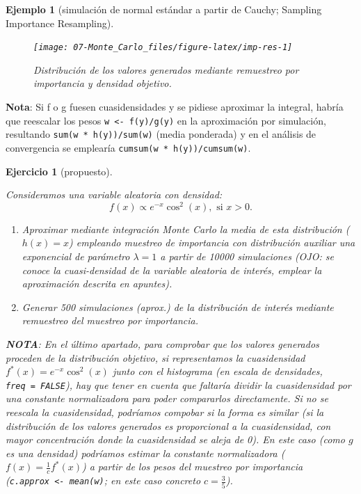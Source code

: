 \documentclass[
  10pt,
]{book}
\theoremstyle{break}
\newtheorem{exercise}{Ejercicio}[chapter]
\newtheorem{example}{Ejemplo}[chapter]
\theoremstyle{nonumberplain}
\begin{document}
\begin{example}[simulación de normal estándar a partir de Cauchy; Sampling Importance Resampling]
\begin{figure}[!htbp]

{\centering \texttt{[image: 07-Monte\_Carlo\_files/figure-latex/imp-res-1]} 

}

\caption{Distribución de los valores generados mediante remuestreo por importancia y densidad objetivo.}\label{fig:imp-res}
\end{figure}

\end{example}

\textbf{Nota}: Si f o g fuesen cuasidensidades y se pidiese aproximar la integral, habría que reescalar los pesos \texttt{w\ \textless{}-\ f(y)/g(y)} en la aproximación por simulación, resultando \texttt{sum(w\ *\ h(y))/sum(w)} (media ponderada) y en el análisis de convergencia se emplearía \texttt{cumsum(w\ *\ h(y))/cumsum(w)}.

\begin{exercise}[propuesto]
\protect\hypertarget{exr:mc-imp-sample2}{}\label{exr:mc-imp-sample2}

Consideramos una variable aleatoria con densidad:
\[f(x)\propto e^{-x}\cos^{2}(x),\text{ si }x>0.\]

\begin{enumerate}
\def\labelenumi{\alph{enumi}.}
\item
  Aproximar mediante integración Monte Carlo la media de esta
  distribución (\(h(x)=x\)) empleando muestreo de importancia con
  distribución auxiliar una exponencial de parámetro \(\lambda=1\) a
  partir de 10000 simulaciones (OJO: se conoce la cuasi-densidad
  de la variable aleatoria de interés, emplear la aproximación descrita
  en apuntes).
\item
  Generar 500 simulaciones (aprox.) de la distribución de interés
  mediante remuestreo del muestreo por importancia.
\end{enumerate}

\textbf{NOTA}: En el último apartado, para comprobar que los valores generados proceden de la distribución objetivo, si representamos la cuasidensidad \(f^{\ast}(x) = e^{-x}\cos^{2}(x)\) junto con el histograma (en escala de densidades, \texttt{freq\ =\ FALSE}), hay que tener en cuenta que faltaría dividir la cuasidensidad por una constante normalizadora para poder compararlos directamente.
Si no se reescala la cuasidensidad, podríamos compobar si la forma es similar (si la distribución de los valores generados es proporcional a la cuasidensidad, con mayor concentración donde la cuasidensidad se aleja de 0).
En este caso (como \(g\) es una densidad) podríamos estimar la constante normalizadora (\(f(x) = \frac{1}{c}f^{\ast}(x)\)) a partir de los pesos del muestreo por importancia (\texttt{c.approx\ \textless{}-\ mean(w)}; en este caso concreto \(c=\frac{3}{5}\)).
\end{exercise}
\end{document}

